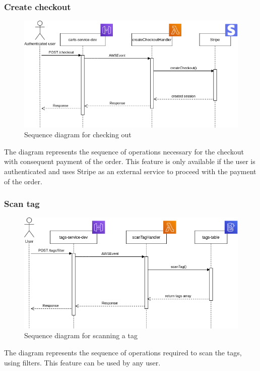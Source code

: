 \subsubsection{Create checkout}
\begin{figure}[!h]
    \vspace{5px}
    \includegraphics[scale=0.5]{../../../../Images/Diagrammi/maintainerManual/createCheckoutSequence.png}
    \centering
    \caption{Sequence diagram for checking out}
\end{figure}
The diagram represents the sequence of operations necessary for the checkout with consequent payment of the order. This feature is only available if the user is authenticated and uses Stripe as an external service to proceed with the payment of the order.
\pagebreak
\subsubsection{Scan tag}
\begin{figure}[!h]
    \vspace{5px}
    \includegraphics[scale=0.5]{../../../../Images/Diagrammi/maintainerManual/scanTagSequence.png}
    \centering
    \caption{Sequence diagram for scanning a tag}
\end{figure}
The diagram represents the sequence of operations required to scan the tags, using filters. This feature can be used by any user.
\pagebreak
